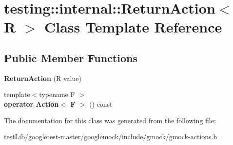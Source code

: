\hypertarget{classtesting_1_1internal_1_1ReturnAction}{}\section{testing\+:\+:internal\+:\+:Return\+Action$<$ R $>$ Class Template Reference}
\label{classtesting_1_1internal_1_1ReturnAction}
\subsection*{Public Member Functions}
\begin{DoxyCompactItemize}
\item 
\mbox{\label{classtesting_1_1internal_1_1ReturnAction_af65344e503dae3ab36b4fd6d1ede6fb7}} 
{\bfseries Return\+Action} (R value)
\item 
\mbox{\label{classtesting_1_1internal_1_1ReturnAction_a1aab69c4ea104e76e70ba209763f61d5}} 
{\footnotesize template$<$typename F $>$ }\\{\bfseries operator Action$<$ F $>$} () const
\end{DoxyCompactItemize}


The documentation for this class was generated from the following file\+:\begin{DoxyCompactItemize}
\item 
test\+Lib/googletest-\/master/googlemock/include/gmock/gmock-\/actions.\+h\end{DoxyCompactItemize}
